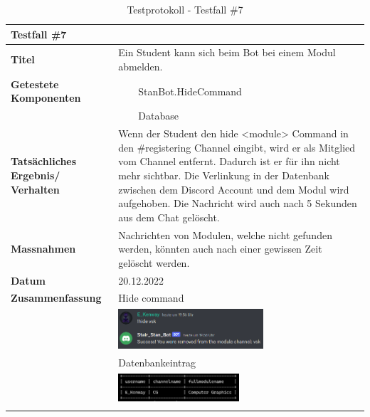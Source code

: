 \documentclass[a4paper, table]{article}
\newcommand{\tabitem}{~~\llap{\textbullet}~~}
\begin{document}
\begin{longtable}[h]{|p{9em}|p{31em}|}
    \hline
    \multicolumn{2}{|l|}{\textbf{Testfall \#7}} \\
    \hline
    \textbf{Titel} & Ein Student kann sich beim Bot bei einem Modul abmelden. \\
    \hline
    \textbf{Getestete Komponenten} & 
        \tabitem StanBot.HideCommand \\*
     &  \tabitem Database \\
    \hline
    \textbf{Tatsächliches Ergebnis/ Verhalten} & 
        Wenn der Student den hide <module> Command in den \#registering Channel eingibt, wird er als Mitglied vom Channel entfernt. 
        Dadurch ist er für ihn nicht mehr sichtbar.
        Die Verlinkung in der Datenbank zwischen dem Discord Account und dem Modul wird aufgehoben.
        Die Nachricht wird auch nach 5 Sekunden aus dem Chat gelöscht. \\
    \hline
    \textbf{Massnahmen} & Nachrichten von Modulen, welche nicht gefunden werden, könnten auch nach einer gewissen Zeit gelöscht werden. \\
    \hline
    \textbf{Datum} & 20.12.2022\\
    \hline
    \textbf{Zusammenfassung} & 
        Hide command \\*
    &  \includegraphics[width=0.6\textwidth]{img/Tests/7_Test_HideCommandMessage.png} \\*
    &  Datenbankeintrag \\*
    &  \includegraphics[width=0.5\textwidth]{img/Tests/7_Test_HideCommandDatabase.png} \\
    \hline
    \caption{Testprotokoll - Testfall \#7}
\end{longtable}
\end{document}
